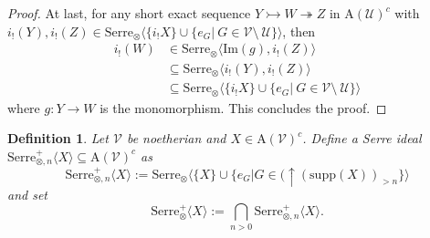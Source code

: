 \documentclass[11pt,a4paper]{amsart}
\numberwithin{equation}{section} \theoremstyle{plain}
\newtheorem{definition}[lem]{Definition}
\newenvironment{df}{\begin{definition}\rm}{\end{definition}}
\begin{document}
\begin{proof}
At last, for any short exact sequence $Y\rightarrowtail W\twoheadrightarrow Z$ in $\mathrm{A}(\mathcal{U})^{c}$ with $i_{!}(Y), i_{!}(Z)\in  \mathrm{Serre}_{\otimes}\langle  \{i_{!}X\}\cup \{e_{G}|~G\in \mathcal{V}\setminus~\mathcal{U}\} \rangle$, then \begin{align*}
  i_{!}(W) &\in \mathrm{Serre}_{\otimes}\langle  \mathrm{Im}(g), i_{!}(Z) \rangle\\
  &\subseteq \mathrm{Serre}_{\otimes}\langle i_{!}(Y), i_{!}(Z) \rangle\\
  &\subseteq \mathrm{Serre}_{\otimes}\langle  \{i_{!}X\}\cup \{e_{G}|~G\in \mathcal{V}\setminus~\mathcal{U}\} \rangle
\end{align*} where $g:Y\rightarrow W$ is the monomorphism. This concludes the proof.
\end{proof}

\begin{df} \label{df 4.13} Let $\mathcal{V}$ be noetherian and $X\in \mathrm{A}(\mathcal{V})^{c}$. Define a Serre ideal $\mathrm{Serre}_{\otimes,n}^{+}\langle X\rangle\subseteq \mathrm{A}(\mathcal{V})^{c}$ as $$\mathrm{Serre}_{\otimes,n}^{+}\langle X\rangle:=\mathrm{Serre}_{\otimes}\langle \{X\}\cup \{e_{G}| G\in (\uparrow(\mathrm{supp}(X))_{>n}\}\rangle$$ and set $$\mathrm{Serre}_{\otimes}^{+}\langle X\rangle:=\bigcap_{n>0}\mathrm{Serre}_{\otimes,n}^{+}\langle X\rangle.$$
\end{df}
\end{document}
